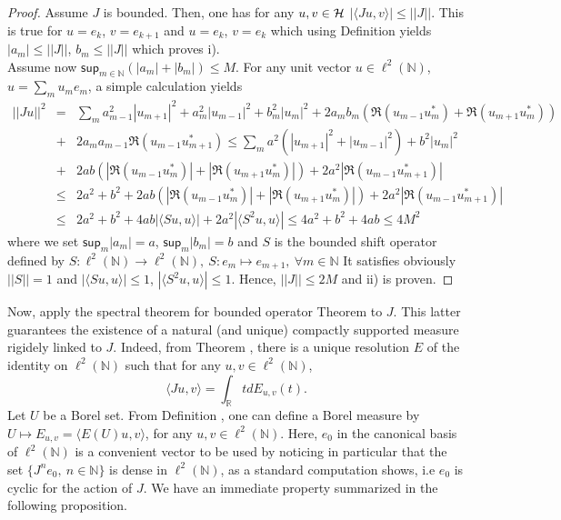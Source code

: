 \documentclass[10pt]{book}
\renewcommand{\sup}{\mathsf{sup}}
\let\int\int
\theoremstyle{break}
\begin{document}
\begin{proof}
Assume $J$ is bounded. Then, one has for any $u,v\in\cal{H}$ $|\langle Ju,v \rangle|\le ||J||$. This is true for $u=e_k$, $v=e_{k+1}$ and $u=e_k$, $v=e_k$ which using Definition %
yields $|a_m|\le||J||$, $b_m\le||J||$ which proves i). \\
Assume now $\sup_{m\in\mathbb{N}}(|a_m|+|b_m|)\le M$. For any unit vector $u\in\ell^2(\mathbb{N})$, $u=\sum_mu_me_m$, a simple calculation yields
\begin{eqnarray}
||Ju||^2&=&\sum_ma^2_{m-1}|u_{m+1}|^2+a^2_m|u_{m-1}|^2+b^2_m|u_m|^2+2a_mb_m(\Re(u_{m-1}u^*_m)+\Re(u_{m+1}u^*_m))\nonumber\\
&+&2a_ma_{m-1}\Re(u_{m-1}u^*_{m+1})\le\sum_ma^2(|u_{m+1}|^2+|u_{m-1}|^2)+b^2|u_m|^2\nonumber\\
&+&2ab(|\Re(u_{m-1}u^*_m)|+|\Re(u_{m+1}u^*_m)|)+2a^2|\Re(u_{m-1}u^*_{m+1})|\nonumber\\
&\le&2a^2+b^2+2ab(|\Re(u_{m-1}u^*_m)|+|\Re(u_{m+1}u^*_m)|)+2a^2|\Re(u_{m-1}u^*_{m+1})|\nonumber\\
&\le&2a^2+b^2+4ab|\langle Su,u \rangle|+2a^2|\langle S^2u,u\rangle|\le4a^2+b^2+4ab\le4M^2
\end{eqnarray}
where we set $\sup_m|a_m|=a$, $\sup_m|b_m|=b$ and $S$ is the bounded shift operator defined by $
S:\ell^2(\mathbb{N})\to\ell^2(\mathbb{N}),\ S:e_m\mapsto e_{m+1},\ \forall m\in\mathbb{N}$
It satisfies obviously $||S||=1$ and $|\langle Su,u\rangle|\le1$, $|\langle S^2u,u \rangle|\le1$. Hence, $||J||\le2M$ and ii) is proven.
\end{proof} 
Now, apply the spectral theorem for bounded operator Theorem %
to $J$. This latter guarantees the existence of a natural (and unique) compactly supported measure rigidely linked to $J$. Indeed, from Theorem %
, there is a unique resolution $E$ of the identity on $\ell^2(\mathbb{N})$ such that for any $u,v\in\ell^2(\mathbb{N})$, 
\begin{equation}
\langle Ju,v \rangle=\int_\mathbb{R}tdE_{u,v}(t). 
\end{equation}
Let $U$ be a Borel set. From Definition %
, one can define a Borel measure by $U\mapsto E_{u,v}=\langle E(U)u,v \rangle$, for any $u,v\in\ell^2(\mathbb{N})$. Here, $e_0$ in the canonical basis of $\ell^2(\mathbb{N})$ is a convenient vector to be used by noticing in particular that the set $\{J^ne_0,\ n\in\mathbb{N}\}$ is dense in $\ell^2(\mathbb{N})$, as a standard computation shows, i.e $e_0$ is cyclic for the action of $J$. We have an immediate property summarized in the following proposition.
\end{document}
